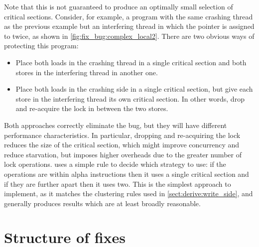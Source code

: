 Note that this is not guaranteed to produce an optimally small
selection of critical sections.  Consider, for example, a program with
the same crashing thread as the previous example but an interfering
thread in which the pointer is assigned to twice, as shown in
\autoref{fig:fix_bug:complex_local2}.  There are two obvious ways of
protecting this program:
\begin{itemize}
\item
  Place both loads in the crashing thread in a single critical section and
  both stores in the interfering thread in another one.
\item
  Place both loads in the crashing side in a single critical section,
  but give each store in the interfering thread its own critical
  section.  In other words, drop and re-acquire the lock in between
  the two stores.
\end{itemize}
Both approaches correctly eliminate the bug, but they will have
different performance characteristics.  In particular, dropping and
re-acquiring the lock reduces the size of the critical section, which
might improve concurrency and reduce starvation, but imposes higher
overheads due to the greater number of lock operations.  {\Technique}
uses a simple rule to decide which strategy to use: if the operations
are within \gls{alpha} instructions then it uses a single critical
section and if they are further apart then it uses two.  This is the
simplest approach to implement, as it matches the clustering rules
used in \autoref{sect:derive:write_side}, and generally produces
results which are at least broadly reasonable.

\section{Structure of fixes}

